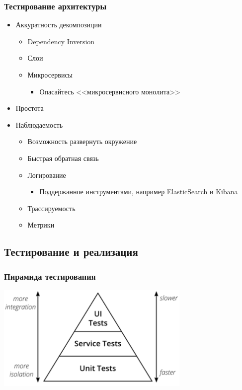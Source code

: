 \documentclass{../../slides-style}
\begin{document}
    \begin{frame}
        \frametitle{Тестирование архитектуры}
        \begin{itemize}
            \item Аккуратность декомпозиции
            \begin{itemize}
                \item Dependency Inversion
                \item Слои
                \item Микросервисы
                \begin{itemize}
                    \item Опасайтесь <<микросервисного монолита>>
                \end{itemize}
            \end{itemize}
            \item Простота
            \item Наблюдаемость
            \begin{itemize}
                \item Возможность развернуть окружение
                \item Быстрая обратная связь
                \item Логирование
                \begin{itemize}
                    \item Поддержанное инструментами, например ElasticSearch и Kibana
                \end{itemize}
                \item Трассируемость
                \item Метрики
            \end{itemize}
        \end{itemize}
    \end{frame}

    \subsection{Тестирование и реализация}

    \begin{frame}
        \frametitle{Пирамида тестирования}
        \begin{center}
            \includegraphics[width=0.7\textwidth]{testPyramid.png}
        \end{center}
    \end{frame}
\end{document}
